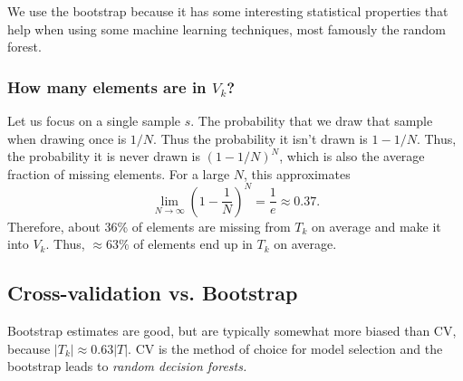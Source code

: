 \documentclass[titlepage, 12pt, leqno]{article}
\begin{document}
We use the bootstrap because it has some interesting statistical properties that
help when using some machine learning techniques, most famously the random
forest.

\subsubsection{How many elements are in $V_{k}$?}
Let us focus on a single sample $s$. The probability that we draw that sample
when drawing once is $1/N$. Thus the probability it isn't drawn is $1 - 1/N$.
Thus, the probability it is never drawn is $(1-1/N)^{N}$, which is also the
average fraction of missing elements. For a large $N$, this approximates
\[
\lim_{N \to \infty} \left(1 - \frac{1}{N}\right)^{N} = \frac{1}{e} \approx 0.37.
\]
Therefore, about 36\% of elements are missing from $T_{k}$ on average and make
it into $V_{k}$. Thus, $\approx 63\%$ of elements end up in $T_{k}$ on 
average.

\subsection{Cross-validation vs. Bootstrap}
Bootstrap estimates are good, but are typically somewhat more biased than CV,
because $|T_{k}|\approx 0.63|T|$. CV is the method of choice for model selection
and the bootstrap leads to \textit{random decision forests.}
\end{document}
